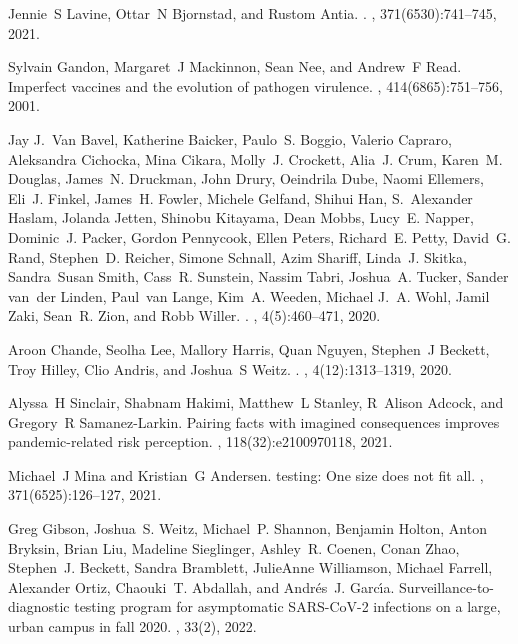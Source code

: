 \documentclass[12pt]{article}
\begin{document}
\begin{thebibliography}{10}
Jennie~S Lavine, Ottar~N Bjornstad, and Rustom Antia.
.
, 371(6530):741--745, 2021.

Sylvain Gandon, Margaret~J Mackinnon, Sean Nee, and Andrew~F Read.
\newblock Imperfect vaccines and the evolution of pathogen virulence.
, 414(6865):751--756, 2001.

Jay J.~Van Bavel, Katherine Baicker, Paulo~S. Boggio, Valerio Capraro,
  Aleksandra Cichocka, Mina Cikara, Molly~J. Crockett, Alia~J. Crum, Karen~M.
  Douglas, James~N. Druckman, John Drury, Oeindrila Dube, Naomi Ellemers,
  Eli~J. Finkel, James~H. Fowler, Michele Gelfand, Shihui Han, S.~Alexander
  Haslam, Jolanda Jetten, Shinobu Kitayama, Dean Mobbs, Lucy~E. Napper,
  Dominic~J. Packer, Gordon Pennycook, Ellen Peters, Richard~E. Petty, David~G.
  Rand, Stephen~D. Reicher, Simone Schnall, Azim Shariff, Linda~J. Skitka,
  Sandra~Susan Smith, Cass~R. Sunstein, Nassim Tabri, Joshua~A. Tucker, Sander
  van~der Linden, Paul~van Lange, Kim~A. Weeden, Michael J.~A. Wohl, Jamil
  Zaki, Sean~R. Zion, and Robb Willer.
.
, 4(5):460--471, 2020.

Aroon Chande, Seolha Lee, Mallory Harris, Quan Nguyen, Stephen~J Beckett, Troy
  Hilley, Clio Andris, and Joshua~S Weitz.
.
, 4(12):1313--1319, 2020.

Alyssa~H Sinclair, Shabnam Hakimi, Matthew~L Stanley, R~Alison Adcock, and
  Gregory~R Samanez-Larkin.
\newblock Pairing facts with imagined consequences improves pandemic-related
  risk perception.
,
  118(32):e2100970118, 2021.

Michael~J Mina and Kristian~G Andersen.
 testing: One size does not fit all.
, 371(6525):126--127, 2021.

Greg Gibson, Joshua~S. Weitz, Michael~P. Shannon, Benjamin Holton, Anton
  Bryksin, Brian Liu, Madeline Sieglinger, Ashley~R. Coenen, Conan Zhao,
  Stephen~J. Beckett, Sandra Bramblett, JulieAnne Williamson, Michael Farrell,
  Alexander Ortiz, Chaouki~T. Abdallah, and Andr{\'e}s~J. Garc{\'\i}a.
\newblock Surveillance-to-diagnostic testing program for asymptomatic
  {SARS-CoV-2} infections on a large, urban campus in fall 2020.
, 33(2), 2022.


\end{thebibliography}
\end{document}
